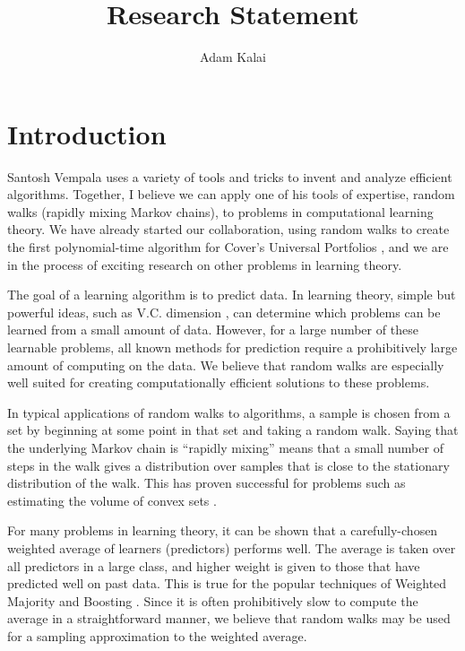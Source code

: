 


\title{Research Statement}
\author{Adam Kalai}
\maketitle

\section{Introduction}
Santosh Vempala uses a variety of tools and tricks to invent and analyze
efficient algorithms.  Together, I believe we can apply one of his tools of
expertise, random walks (rapidly mixing Markov chains), to problems in
computational learning theory.  We have already started our collaboration,
using random walks to create the first polynomial-time algorithm for Cover's
Universal Portfolios \cite{KV}, and we are in the process of exciting research
on other problems in learning theory.

The goal of a learning algorithm is to predict data.  In learning theory,
simple but powerful ideas, such as V.C. dimension \cite{VC}, can determine
which problems can be learned from a small amount of data.  However, for a
large number of these learnable problems, all known methods for prediction
require a prohibitively large amount of computing on the data.  We believe
that random walks are especially well suited for creating computationally
efficient solutions to these problems.

In typical applications of random walks to algorithms, a sample is chosen from
a set by beginning at some point in that set and taking a random walk.  Saying
that the underlying Markov chain is ``rapidly mixing'' means that a small
number of steps in the walk gives a distribution over samples that is close to
the stationary distribution of the walk.  This has proven successful for
problems such as estimating the volume of convex sets \cite{KLS}.

For many problems in learning theory, it can be shown that a carefully-chosen
weighted average of learners (predictors) performs well.  The average is taken
over all predictors in a large class, and higher weight is given to those that
have predicted well on past data.  This is true for the popular techniques of
Weighted Majority \cite{LW} and Boosting \cite{Schapire}.  Since it is often
prohibitively slow to compute the average in a straightforward manner, we
believe that random walks may be used for a sampling approximation to the
weighted average.

